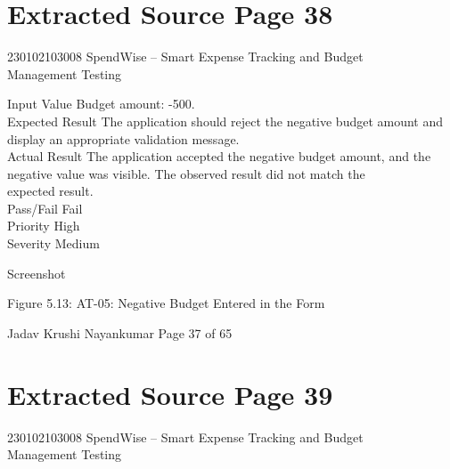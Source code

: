 \documentclass[12pt,a4paper]{report}
\begin{document}
\clearpage
\section*{Extracted Source Page 38}
230102103008                        SpendWise – Smart Expense Tracking and Budget\\ 
Management Testing\\ 

\smallskip

\smallskip
Input Value             Budget amount: -500.\\ 
Expected Result         The application should reject the negative budget amount and\\ 
display an appropriate validation message.\\ 
Actual Result           The application accepted the negative budget amount, and the\\ 
negative value was visible. The observed result did not match the\\ 
expected result.\\ 
Pass/Fail               Fail\\ 
Priority                High\\ 
Severity                Medium\\ 

\smallskip

\smallskip
Screenshot\\ 

\smallskip

\smallskip

\smallskip

\smallskip
Figure 5.13: AT-05: Negative Budget Entered in the Form\\ 

\smallskip

\smallskip

\smallskip

\smallskip
Jadav Krushi Nayankumar                                                      Page 37 of 65\\ 

\clearpage
\section*{Extracted Source Page 39}
230102103008                          SpendWise – Smart Expense Tracking and Budget\\ 
Management Testing\\ 
\end{document}

